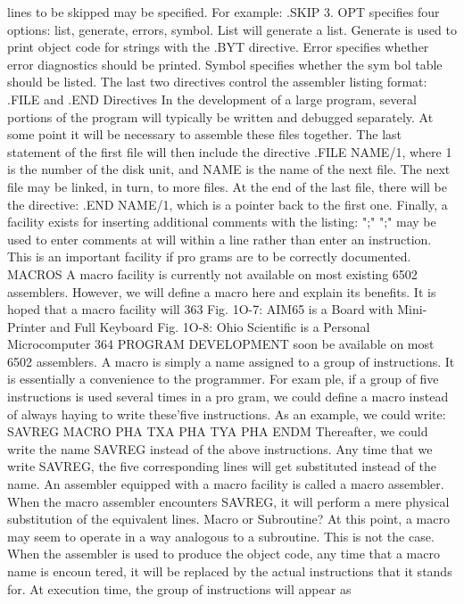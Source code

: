 \documentclass{book}
\begin{document}
{{{{{{{{{{{{{{{{{{{{{{{{{{{{{{{{{{{{{{{{{{{{{{{{{{{{{{{{{{{{{{{{{{{{{{{{{{{{{{{{{{{{{{{{{{{{{{{{{{{{{{{{{{{{{{{{{{{{{{{{{{{{{{{{{{{{{{{{{{{{lines to be skipped may be specified. For example: .SKIP 3.
OPT specifies four options: list, generate, errors, symbol. List
will generate a list. Generate is used to print object code for
strings with the .BYT directive. Error specifies whether error
diagnostics should be printed. Symbol specifies whether the sym
bol table should be listed.
The last two directives control the assembler listing format:
.FILE and .END Directives
In the development of a large program, several portions of the
program will typically be written and debugged separately. At
some point it will be necessary to assemble these files together.
The last statement of the first file will then include the directive
.FILE NAME/1, where 1 is the number of the disk unit, and
NAME is the name of the next file. The next file may be linked, in
turn, to more files. At the end of the last file, there will be the
directive: .END NAME/1, which is a pointer back to the first one.
Finally, a facility exists for inserting additional comments with
the listing: ";"
";" may be used to enter comments at will within a line rather
than enter an instruction. This is an important facility if pro
grams are to be correctly documented.
MACROS
A macro facility is currently not available on most existing
6502 assemblers. However, we will define a macro here and
explain its benefits. It is hoped that a macro facility will
363
Fig. 1O-7: AIM65 is a Board with Mini-Printer and Full Keyboard
Fig. 1O-8: Ohio Scientific is a Personal Microcomputer
364
PROGRAM DEVELOPMENT
soon be available on most 6502 assemblers.
A macro is simply a name assigned to a group of instructions.
It is essentially a convenience to the programmer. For exam
ple, if a group of five instructions is used several times in a pro
gram, we could define a macro instead of always haying to write
these'five instructions. As an example, we could write:
SAVREG MACRO PHA
TXA
PHA
TYA
PHA
ENDM
Thereafter, we could write the name SAVREG instead of the above
instructions.
Any time that we write SAVREG, the five corresponding lines
will get substituted instead of the name. An assembler equipped
with a macro facility is called a macro assembler. When the
macro assembler encounters SAVREG, it will perform a mere
physical substitution of the equivalent lines.
Macro or Subroutine?
At this point, a macro may seem to operate in a way analogous
to a subroutine. This is not the case. When the assembler is used
to produce the object code, any time that a macro name is encoun
tered, it will be replaced by the actual instructions that it stands
for. At execution time, the group of instructions will appear as
}}}}}}}}}}}}}}}}}}}}}}}}}}}}}}}}}}}}}}}}}}}}}}}}}}}}}}}}}}}}}}}}}}}}}}}}}}}}}}}}}}}}}}}}}}}}}}}}}}}}}}}}}}}}}}}}}}}}}}}}}}}}}}}}}}}}}}}}}}}}
\end{document}
